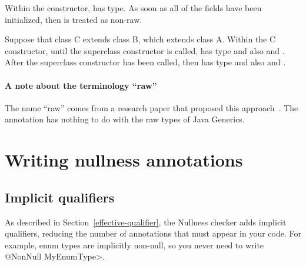 Within the constructor,
 has  type.
As soon as all of the  fields
have been initialized, then  is treated as non-raw.


Suppose that class C extends class B, which extends class A.  Within the C
constructor, until the superclass constructor is called,  has
type  and also  and .  After the
superclass constructor has been called, then  has type
 and also  and .



\paragraph{A note about the terminology ``raw''}

The name ``raw'' comes from a research paper that proposed this
approach~\cite{FahndrichL2003}.  The 
annotation has nothing to do with the raw types of Java Generics.



\section{Writing nullness annotations\label{writing-nullness-annotations}}

\subsection{Implicit qualifiers\label{nullness-implicit-qualifiers}}

As described in Section~\ref{effective-qualifier}, the Nullness checker
adds implicit qualifiers, reducing the number of annotations that must
appear in your code.
For example, enum types are implicitly non-null, so you never need to write
\<@NonNull MyEnumType>.

